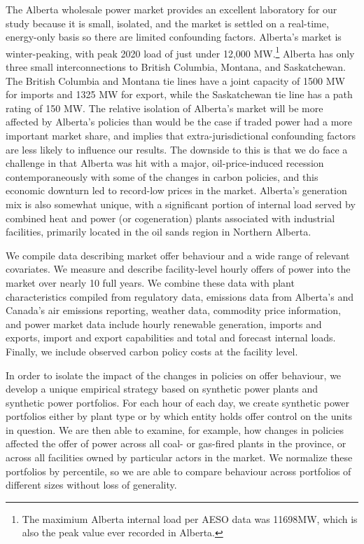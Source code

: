 \documentclass[12pt]{article}
\begin{document}
The Alberta wholesale power market provides an excellent laboratory for our study because it is small, isolated, and the market is settled on a real-time, energy-only basis so there are limited confounding factors. Alberta's market is winter-peaking, with peak 2020 load of just under 12,000 MW.\footnote{The maximium Alberta internal load per AESO data was 11698MW, which is also the peak value ever recorded in Alberta.}  Alberta has only three small interconnections to British Columbia, Montana, and Saskatchewan. The British Columbia and Montana tie lines have a joint capacity of 1500 MW for imports and 1325 MW for export, while the Saskatchewan tie line has a path rating of 150 MW. The relative isolation of Alberta's market will be more affected by Alberta's policies than would be the case if traded power had a more important market share, and implies that extra-jurisdictional confounding factors are less likely to influence our results. The downside to this is that we do face a challenge in that Alberta was hit with a major, oil-price-induced recession contemporaneously with some of the changes in carbon policies, and this economic downturn led to record-low prices in the market. Alberta's generation mix is also somewhat unique, with a significant portion of internal load served by combined heat and power (or cogeneration) plants associated with industrial facilities, primarily located in the oil sands region in Northern Alberta.

We compile data describing market offer behaviour and a wide range of relevant covariates.  We measure and describe facility-level hourly offers of power into the market over nearly 10 full years.  We combine these data with plant characteristics compiled from regulatory data, emissions data from Alberta's and Canada's air emissions reporting, weather data, commodity price information, and power market data include hourly renewable generation, imports and exports, import and export capabilities and total and forecast internal loads.  Finally, we include observed carbon policy costs at the facility level.

In order to isolate the impact of the changes in policies on offer behaviour, we develop a unique empirical strategy based on synthetic power plants and synthetic power portfolios.  For each hour of each day, we create synthetic power portfolios either by plant type or by which entity holds offer control on the units in question.  We are then able to examine, for example, how changes in policies affected the offer of power across all coal- or gas-fired plants in the province, or across all facilities owned by particular actors in the market.  We normalize these portfolios by percentile, so we are able to compare behaviour across portfolios of different sizes without loss of generality.
\end{document}

